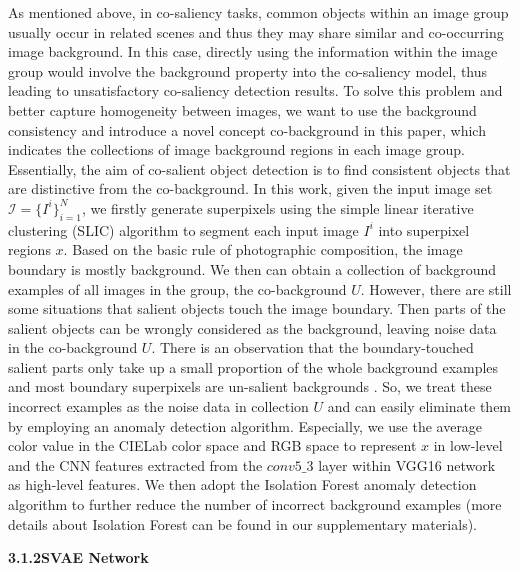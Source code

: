 \documentclass[sigconf]{acmart}
\begin{document}
\noindent As mentioned above, in co-saliency tasks, common objects within an image group usually occur in related scenes and thus they may share similar and co-occurring image background. In this case, directly using the information within the image group would involve the background property into the co-saliency model, thus leading to unsatisfactory co-saliency detection results.  To solve this problem and better capture homogeneity between images, we want to use the background consistency and introduce a novel concept co-background in this paper, which indicates the collections of image background regions in each image group.  Essentially, the aim of co-salient object detection is to find consistent objects that are distinctive from the co-background.
In this work, given the input image set $\mathcal{I}=\{I^{i}\}_{i=1 }^{N}$, we firstly generate superpixels using the simple linear iterative clustering (SLIC) algorithm to segment each input image $I^{i}$ into superpixel regions $x$. Based on the basic rule of photographic composition\cite{Lu2016,Han2015}, the image boundary is mostly background. We then can obtain a collection  of background examples of all images in the group, the co-background $U$. However, there are still some situations that salient objects touch the image boundary. Then parts of the salient objects can be wrongly considered as the background, leaving noise data in the co-background $U$.  There is an observation that the boundary-touched salient parts only take up a small proportion of the whole background examples and most boundary superpixels are un-salient backgrounds \cite{DBLP:journals/tip/HanQZN18}. So, we treat these incorrect examples as the noise data in collection $U$ and can easily  eliminate  them  by  employing  an  anomaly  detection  algorithm. Especially, we use the average color value in the CIELab color space and RGB space to represent $x$ in low-level and the CNN features extracted from the $conv5\_3$ layer within VGG16 \cite{DBLP:journals/corr/SimonyanZ14a} network as high-level features. We then adopt the Isolation Forest \cite{DBLP:journals/tkdd/LiuTZ12} anomaly detection algorithm to further reduce the number of incorrect background examples (more details about Isolation Forest can be found in our supplementary materials).

\vspace{3pt}
\noindent \textbf{3.1.2\quad SVAE Network}
\vspace{3pt}
\end{document}
